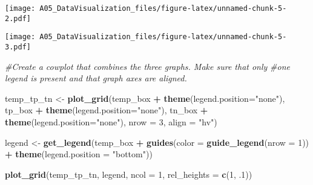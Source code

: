 \documentclass[]{article}
\newenvironment{Shaded}{\begin{snugshade}}{\end{snugshade}}
\newcommand{\CommentTok}[1]{\textcolor[rgb]{0.56,0.35,0.01}{\textit{#1}}}
\newcommand{\DataTypeTok}[1]{\textcolor[rgb]{0.13,0.29,0.53}{#1}}
\newcommand{\DecValTok}[1]{\textcolor[rgb]{0.00,0.00,0.81}{#1}}
\newcommand{\FloatTok}[1]{\textcolor[rgb]{0.00,0.00,0.81}{#1}}
\newcommand{\KeywordTok}[1]{\textcolor[rgb]{0.13,0.29,0.53}{\textbf{#1}}}
\newcommand{\NormalTok}[1]{#1}
\newcommand{\OperatorTok}[1]{\textcolor[rgb]{0.81,0.36,0.00}{\textbf{#1}}}
\newcommand{\StringTok}[1]{\textcolor[rgb]{0.31,0.60,0.02}{#1}}
\begin{document}
\texttt{[image: A05\_DataVisualization\_files/figure-latex/unnamed-chunk-5-2.pdf]}

\begin{Shaded}
\end{Shaded}

\texttt{[image: A05\_DataVisualization\_files/figure-latex/unnamed-chunk-5-3.pdf]}

\begin{Shaded}
\begin{Highlighting}[]
\CommentTok{#Create a cowplot that combines the three graphs. Make sure that only}
\CommentTok{#one legend is present and that graph axes are aligned.}

\NormalTok{temp_tp_tn <-}\StringTok{ }\KeywordTok{plot_grid}\NormalTok{(temp_box }\OperatorTok{+}\StringTok{ }\KeywordTok{theme}\NormalTok{(}\DataTypeTok{legend.position=}\StringTok{"none"}\NormalTok{),}
\NormalTok{                        tp_box }\OperatorTok{+}\StringTok{ }\KeywordTok{theme}\NormalTok{(}\DataTypeTok{legend.position=}\StringTok{"none"}\NormalTok{), }
\NormalTok{                        tn_box }\OperatorTok{+}\StringTok{ }\KeywordTok{theme}\NormalTok{(}\DataTypeTok{legend.position=}\StringTok{"none"}\NormalTok{), }
                        \DataTypeTok{nrow =} \DecValTok{3}\NormalTok{, }\DataTypeTok{align =} \StringTok{"hv"}\NormalTok{)}

\NormalTok{legend <-}\StringTok{ }\KeywordTok{get_legend}\NormalTok{(temp_box }\OperatorTok{+}\StringTok{ }
\StringTok{                       }\KeywordTok{guides}\NormalTok{(}\DataTypeTok{color =} \KeywordTok{guide_legend}\NormalTok{(}\DataTypeTok{nrow =} \DecValTok{1}\NormalTok{)) }\OperatorTok{+}\StringTok{ }
\StringTok{                       }\KeywordTok{theme}\NormalTok{(}\DataTypeTok{legend.position =} \StringTok{"bottom"}\NormalTok{))}

\KeywordTok{plot_grid}\NormalTok{(temp_tp_tn, legend, }\DataTypeTok{ncol =} \DecValTok{1}\NormalTok{, }\DataTypeTok{rel_heights =} \KeywordTok{c}\NormalTok{(}\DecValTok{1}\NormalTok{, }\FloatTok{.1}\NormalTok{))}
\end{Highlighting}
\end{Shaded}
\end{document}
